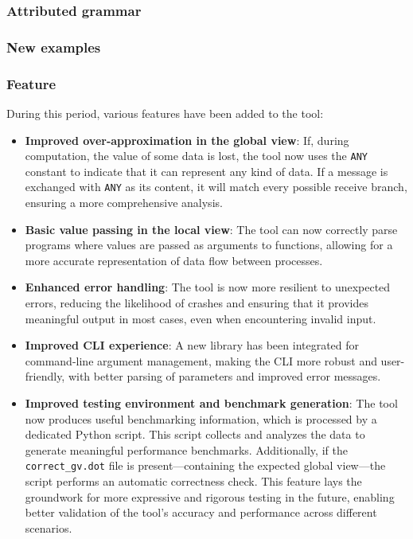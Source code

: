 \subsubsection{Attributed grammar}


\subsubsection{New examples}




\subsubsection{Feature}
During this period, various features have been added to the tool:
\begin{itemize}  
    \item \textbf{Improved over-approximation in the global view}:  
    If, during computation, the value of some data is lost, the tool now  
    uses the \texttt{ANY} constant to indicate that it can represent any kind  
    of data. If a message is exchanged with \texttt{ANY} as its content, it  
    will match every possible receive branch, ensuring a more comprehensive  
    analysis.  
    
    \item \textbf{Basic value passing in the local view}:  
    The tool can now correctly parse programs where values are passed as  
    arguments to functions, allowing for a more accurate representation of  
    data flow between processes.  
    
    \item \textbf{Enhanced error handling}:  
    The tool is now more resilient to unexpected errors, reducing the  
    likelihood of crashes and ensuring that it provides meaningful output in  
    most cases, even when encountering invalid input.  
    
    \item \textbf{Improved CLI experience}:  
    A new library has been integrated for command-line argument management,  
    making the CLI more robust and user-friendly, with better parsing of  
    parameters and improved error messages.  

    \item \textbf{Improved testing environment and benchmark generation}:  
    The tool now produces useful benchmarking information, which is processed  
    by a dedicated Python script. This script collects and analyzes the data  
    to generate meaningful performance benchmarks. Additionally, if the  
    \texttt{correct\_gv.dot} file is present—containing the expected global  
    view—the script performs an automatic correctness check. This feature  
    lays the groundwork for more expressive and rigorous testing in the future,  
    enabling better validation of the tool's accuracy and performance across  
    different scenarios.  

\end{itemize}

